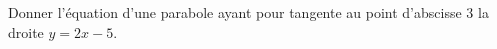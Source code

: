 
\begin{exercice}\label{exosmath-0351}

Donner l'équation d'une parabole ayant pour tangente au point d'abscisse \( 3\) la droite $y=2 x−5$.

\end{exercice}
